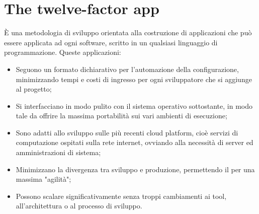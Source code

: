 \documentclass[NormeDiProgetto.tex]{subfiles}
\begin{document}
\chapter{The twelve-factor app}
\`{E} una metodologia di sviluppo orientata alla costruzione di applicazioni  che può essere applicata ad ogni software, scritto in un qualsiasi linguaggio di programmazione.
Queste applicazioni:
\begin{itemize}
\item Seguono un formato dichiarativo per l'automazione della configurazione, minimizzando tempi e costi di ingresso per ogni sviluppatore che si aggiunge al progetto;
\item Si interfacciano in modo pulito con il sistema operativo sottostante, in modo tale da offrire la massima portabilità sui vari ambienti di esecuzione;
\item Sono adatti allo sviluppo sulle più recenti cloud platform, cioè servizi di computazione ospitati sulla rete internet, ovviando alla necessità di server ed amministrazioni di sistema;
\item Minimizzano la divergenza tra sviluppo e produzione, permettendo il  per una massima "agilità";
\item Possono scalare significativamente senza troppi cambiamenti ai tool, all'architettura o al processo di sviluppo.
\end{itemize}
\end{document}
